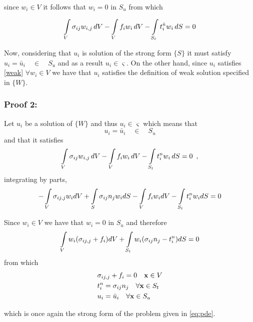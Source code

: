 since $w_i \in V$ it follows that $w_i = 0$ in $S_u$ from which

\begin{equation}\label{weak}
\int\limits_V \sigma _{ij} w_{i,j}\, dV - \int\limits_V f_i w_i\, dV  - \int\limits_{S_t} t_i^{\hat n} w_i\, dS = 0
\end{equation}

Now, considering that $u_i$ is solution of the strong form $\{S\}$ it must satisfy $u_i = \bar u_{i} \quad \in \quad S_u$ and as a result $u_i \in \varsigma$. On the other hand, since $u_i$ satisfies \cref{weak} $\forall {w_i} \in V$ we have that $u_i$ satisfies the definition of weak solution specified in $\{ W \}$.

\subsubsection*{Proof 2:}
Let $u_i$ be a solution of $\{W\}$ and thus $u_i \in \varsigma$ which means that
\[u_i = \bar u_{i} \quad \in \quad S_u\]
and that it satisfies
\[\int\limits_V \sigma _{ij} w_{i,j}\, dV - \int\limits_V f_i w_i\, dV - \int\limits_{S_t} t_i^n w_i\, dS = 0 \enspace ,\]
integrating by parts,
\[-\int\limits_V \sigma_{ij,j} w_idV + \int\limits_S \sigma_{ij} n_j w_i dS  - \int\limits_V f_i w_i dV - \int\limits_{S_t} {t_i^n} w_i dS = 0\]

Since ${w_i} \in V$ we have that ${w_i}=0$ in $S_u$ and therefore
\[\int\limits_V w_i(\sigma_{ij,j} + f_i)dV + \int\limits_{S_t} w_i( \sigma_{ij} n_j - t_i^n )dS = 0 \]
from which
\begin{equation} \label{equil_2}
\begin{split}
&\sigma_{ij,j} + f_i = 0 \quad \vb{x} \in V \\
&t_i^n = \sigma_{ij} n_j \quad \forall \vb{x} \in S_t\\
&{u_i} = \bar{u}_i \quad \forall \vb{x} \in S_u
\end{split}
\end{equation}

which is once again the strong form of the problem given in \cref{eq:pde}.

